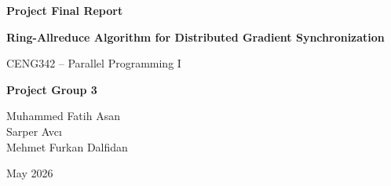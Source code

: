 \documentclass[12pt,a4paper]{article}
\begin{document}
\begin{titlepage}
    \centering
    \vspace*{2cm}

    {\Large\bfseries Project Final Report\par}
    \vspace{0.5cm}
    {\LARGE\bfseries Ring-Allreduce Algorithm for Distributed Gradient Synchronization\par}
    \vspace{1.5cm}

    {\large CENG342 -- Parallel Programming I\par}
    \vspace{2cm}

    {\large\bfseries Project Group 3\par}
    \vspace{1cm}

    Muhammed Fatih Asan\\[0.3cm]
    Sarper Avc{\i}\\[0.3cm]
    Mehmet Furkan Dalfidan

    \vfill

    {\large May 2026\par}
\end{titlepage}

\begin{abstract}
\noindent This report presents the implementation and empirical evaluation of the Ring-Allreduce collective communication algorithm using OpenMPI in C. A naive centralized reduce-broadcast pattern is implemented as a baseline and compared against the ring-based approach across rank counts from 2 to 16 and array sizes from 256\,KB to 100\,MB. Experimental results confirm the theoretical prediction that the centralized baseline scales poorly with payload size while the ring algorithm transmits a payload-bounded amount of data per rank regardless of the number of participants. The ring algorithm outperforms the baseline at every configuration measured, with speedups ranging from $1.26\times$ to $3.71\times$ across the swept range. The implementation is verified for correctness on every configuration tested, and \texttt{gprof} profiling is used to confirm that execution time is dominated by MPI communication rather than auxiliary computation.
\end{abstract}

\clearpage

\tableofcontents

\clearpage
\end{document}
